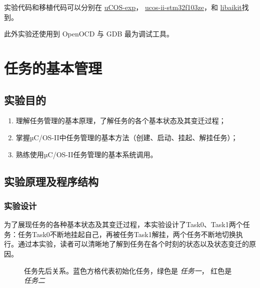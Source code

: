 \documentclass{ctexart}
\begin{document}
    实验代码和移植代码可以分别在 \href{https://github.com/Qinka/uCOS-exp}{uCOS-exp}，
    \href{https://github.com/Qinka/ucos-ii-stm32f103ze}{ucos-ii-stm32f103ze}，和
    \href{https://github.com/Qinka/libaikit/tree/0.1/dev/master}{libaikit}找到。
        
    此外实验还使用到 OpenOCD 与 GDB 最为调试工具。
    
    \section{任务的基本管理}
    \label{sec:task-mang}
    
    \subsection{实验目的}
    
    \begin{enumerate}
        \item 理解任务管理的基本原理，了解任务的各个基本状态及其变迁过程；
        \item 掌握µC/OS-II中任务管理的基本方法（创建、启动、挂起、解挂任务）；
        \item 熟练使用µC/OS-II任务管理的基本系统调用。
    \end{enumerate}
    
    \subsection{实验原理及程序结构}
    
    \subsubsection{实验设计}
    
    为了展现任务的各种基本状态及其变迁过程，本实验设计了Task0、Task1两个任务：任务Task0不断地挂起自己，再被任务Task1解挂，两个任务不断地切换执行。通过本实验，读者可以清晰地了解到任务在各个时刻的状态以及状态变迁的原因。
   
    
    \begin{figure}
        \centering
        \caption{任务先后关系。{\color{initC}蓝色}方格代表初始化任务，{\color{t1C}绿色}是 \textit{任务一}，
            {\color{t2C}红色}是 \textit{任务二}}
        \label{fig:tm-1}
    \end{figure}
    
\end{document}
